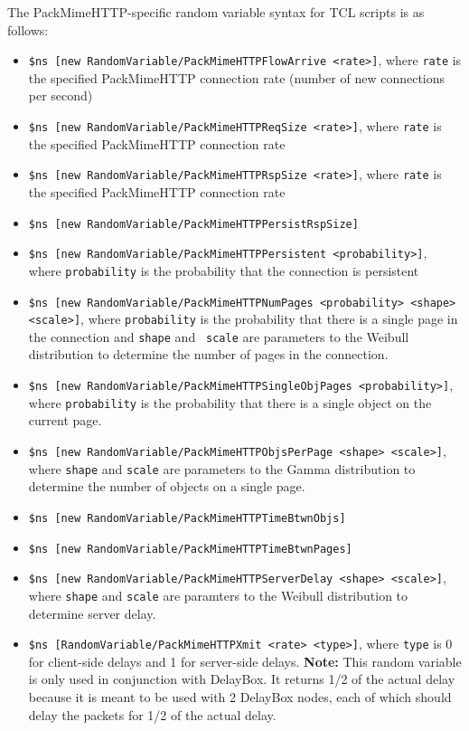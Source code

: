 The PackMimeHTTP-specific random variable syntax for TCL scripts is as
follows:  
\begin{itemize}
\item{{\tt \$ns [new RandomVariable/PackMimeHTTPFlowArrive <rate>]},
where {\tt rate} is the specified PackMimeHTTP connection rate (number  
of new connections per second)}
\item{{\tt \$ns [new RandomVariable/PackMimeHTTPReqSize <rate>]},
where {\tt rate} is the specified PackMimeHTTP connection rate} 
\item{{\tt \$ns [new RandomVariable/PackMimeHTTPRspSize <rate>]},
where {\tt rate} is the specified PackMimeHTTP connection rate}
\item{{\tt \$ns [new RandomVariable/PackMimeHTTPPersistRspSize]}}
\item{{\tt \$ns [new RandomVariable/PackMimeHTTPPersistent
    <probability>]},
where {\tt probability} is the probability that the connection is
    persistent} 
\item{{\tt \$ns [new RandomVariable/PackMimeHTTPNumPages <probability>
<shape> <scale>]}, where {\tt probability} is the probability that
  there is a single page in the connection and {\tt shape} and {\tt
    scale} are parameters to the Weibull distribution to determine the
number of pages in the connection.}
\item{{\tt \$ns [new RandomVariable/PackMimeHTTPSingleObjPages
      <probability>]}, where {\tt probability} is the probability that
      there is a single object on the current page.}
\item{{\tt \$ns [new RandomVariable/PackMimeHTTPObjsPerPage <shape>
      <scale>]}, where {\tt shape} and {\tt scale} are parameters to
      the Gamma distribution to determine the number of objects on a
      single page.}
\item{{\tt \$ns [new RandomVariable/PackMimeHTTPTimeBtwnObjs]}}
\item{{\tt \$ns [new RandomVariable/PackMimeHTTPTimeBtwnPages]}}
\item{{\tt \$ns [new RandomVariable/PackMimeHTTPServerDelay <shape>
      <scale>]}, where {\tt shape} and {\tt scale} are paramters to
      the Weibull distribution to determine server delay.}
\item{{\tt \$ns [RandomVariable/PackMimeHTTPXmit <rate> <type>]}, where
{\tt type} is 0 for client-side delays and 1 for
server-side delays.  \textbf{Note:} This random variable
is only used in conjunction with DelayBox.  It returns 1/2 of the
actual delay because it is meant to be used with 2 DelayBox nodes,
each of which should delay the packets for 1/2 of the actual delay.} 
\end{itemize}

